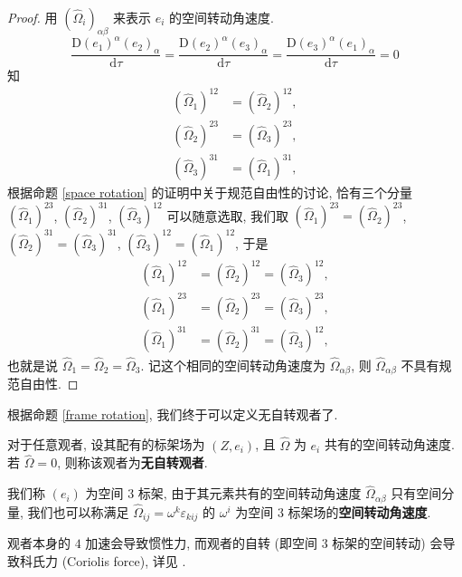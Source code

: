 \begin{proof}
	\label{frame rotation}
	用 $(\hat{\Omega}_i)_{\alpha\beta}$ 来表示 $e_i$ 的空间转动角速度.
	\[ \frac{\mathrm{D}(e_1)^{\alpha}(e_2)_{\alpha}}{\mathrm{d}\tau}=\frac{\mathrm{D}(e_2)^{\alpha}(e_3)_{\alpha}}{\mathrm{d}\tau}=\frac{\mathrm{D}(e_3)^{\alpha}(e_1)_{\alpha}}{\mathrm{d}\tau}=0 \]
	知
	\begin{align*}
		(\hat{\Omega}_1)^{12} &= (\hat{\Omega}_2)^{12},\\
		(\hat{\Omega}_2)^{23} &= (\hat{\Omega}_3)^{23},\\
		(\hat{\Omega}_3)^{31} &= (\hat{\Omega}_1)^{31},
	\end{align*}
	根据命题 \ref{space rotation} 的证明中关于规范自由性的讨论, 恰有三个分量 $(\hat{\Omega}_1)^{23}$, $(\hat{\Omega}_2)^{31}$, $(\hat{\Omega}_3)^{12}$ 可以随意选取, 我们取 $(\hat{\Omega}_1)^{23}=(\hat{\Omega}_2)^{23}$, $(\hat{\Omega}_2)^{31}=(\hat{\Omega}_3)^{31}$, $(\hat{\Omega}_3)^{12}=(\hat{\Omega}_1)^{12}$, 于是
	\begin{align*}
		(\hat{\Omega}_1)^{12} &= (\hat{\Omega}_2)^{12}= (\hat{\Omega}_3)^{12},\\
		(\hat{\Omega}_1)^{23} &= (\hat{\Omega}_2)^{23}= (\hat{\Omega}_3)^{23},\\
		(\hat{\Omega}_1)^{31} &= (\hat{\Omega}_2)^{31}= (\hat{\Omega}_3)^{12},
	\end{align*}
	也就是说 $\hat{\Omega}_1=\hat{\Omega}_2=\hat{\Omega}_3$. 记这个相同的空间转动角速度为 $\hat{\Omega}_{\alpha\beta}$, 则 $\hat{\Omega}_{\alpha\beta}$ 不具有规范自由性.
\end{proof}

根据命题 \ref{frame rotation}, 我们终于可以定义无自转观者了.
\begin{definition}[无自转观者]
	对于任意观者, 设其配有的标架场为 $(Z,e_i)$, 且 $\hat{\Omega}$ 为 $e_i$ 共有的空间转动角速度. 若 $\hat{\Omega}=0$, 则称该观者为{\bf  无自转观者}.
\end{definition}
\begin{remark}
	我们称 $(e_i)$ 为空间 $3$ 标架, 由于其元素共有的空间转动角速度 $\hat{\Omega}_{\alpha\beta}$ 只有空间分量, 我们也可以称满足 $\hat{\Omega}_{ij}=\omega^{k}\varepsilon_{kij}$ 的 $\omega^i$ 为空间 $3$ 标架场的{\bf 空间转动角速度}.
\end{remark}
\begin{remark}
	观者本身的 $4$ 加速会导致惯性力, 而观者的自转 (即空间 $3$ 标架的空间转动) 会导致科氏力 (Coriolis force), 详见 \cite[\S\,7.4]{梁灿彬2000微分几何入门与广义相对论}.
\end{remark}

